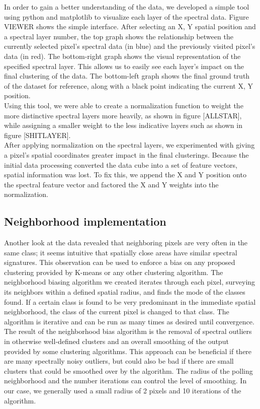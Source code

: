 \documentclass[journal]{IEEEtran}
\begin{document}
    In order to gain a better understanding of the data, we developed a simple tool using python and matplotlib to visualize each layer of the spectral data. Figure VIEWER shows the simple interface.  After selecting an X, Y spatial position and a spectral layer number, the top graph shows the relationship between the currently selected pixel’s spectral data (in blue) and the previously visited pixel’s data (in red). The bottom-right graph shows the visual representation of the specified spectral layer. This allows us to easily see each layer’s impact on the final clustering of the data. The bottom-left graph shows the final ground truth of the dataset for reference, along with a black point indicating the current X, Y position.\\

    Using this tool, we were able to create a normalization function to weight the more distinctive spectral layers more heavily, as shown in figure [ALLSTAR], while assigning a smaller weight to the less indicative layers such as shown in figure [SHITLAYER].\\

    After applying normalization on the spectral layers, we experimented with giving a pixel’s spatial coordinates greater impact in the final clusterings. Because the initial data processing converted the data cube into a set of feature vectors, spatial information was lost. To fix this, we append the X and Y position onto the spectral feature vector and factored the X and Y weights into the normalization.\\

  \subsection{Neighborhood implementation}
    Another look at the data revealed that neighboring pixels are very often in the same class; it seems intuitive that spatially close areas have similar spectral signatures.  This observation can be used to enforce a bias on any proposed clustering provided by K-means or any other clustering algorithm. The neighborhood biasing algorithm we created iterates through each pixel, surveying its neighbors within a defined spatial radius, and finds the mode of the classes found.  If a certain class is found to be very predominant in the immediate spatial neighborhood, the class of the current pixel is changed to that class.  The algorithm is iterative and can be run as many times as desired until convergence.  The result of the neighborhood bias algorithm is the removal of spectral outliers in otherwise well-defined clusters and an overall smoothing of the output provided by some clustering algorithms. This approach can be beneficial if there are many spectrally noisy outliers, but could also be bad if there are small clusters that could be smoothed over by the algorithm. The radius of the polling neighborhood and the number iterations can control the level of smoothing. In our case, we generally used a small radius of 2 pixels and 10 iterations of the algorithm.\\
\end{document}
